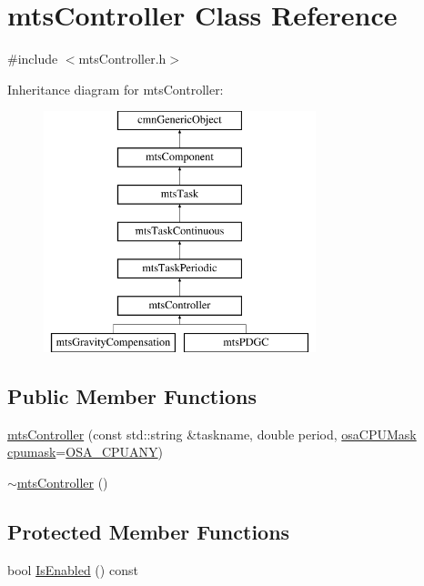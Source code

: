 \hypertarget{classmts_controller}{\section{mts\-Controller Class Reference}
\label{classmts_controller}
}


{\ttfamily \#include $<$mts\-Controller.\-h$>$}

Inheritance diagram for mts\-Controller\-:\begin{figure}[H]
\begin{center}
\leavevmode
\includegraphics[height=7.000000cm]{dd/dc4/classmts_controller}
\end{center}
\end{figure}
\subsection*{Public Member Functions}
\begin{DoxyCompactItemize}
\item 
\hyperlink{classmts_controller_aa638cb1283a8dbaf3542b573674b36a2}{mts\-Controller} (const std\-::string \&taskname, double period, \hyperlink{osa_c_p_u_affinity_8h_aaec7cdd7797e5e6eb5438c15fee5477a}{osa\-C\-P\-U\-Mask} \hyperlink{classmts_controller_a3125e5e9b65dc2347725215e8af73c9f}{cpumask}=\hyperlink{osa_c_p_u_affinity_8h_a2ae5ea257830cff2814d81ce526ada35}{O\-S\-A\-\_\-\-C\-P\-U\-A\-N\-Y})
\item 
\hyperlink{classmts_controller_a84a7764b11c648574c20bb40d00f6e0f}{$\sim$mts\-Controller} ()
\end{DoxyCompactItemize}
\subsection*{Protected Member Functions}
\begin{DoxyCompactItemize}
\item 
bool \hyperlink{classmts_controller_a487a7255506237f1138c9518017fa989}{Is\-Enabled} () const 
\end{DoxyCompactItemize}
